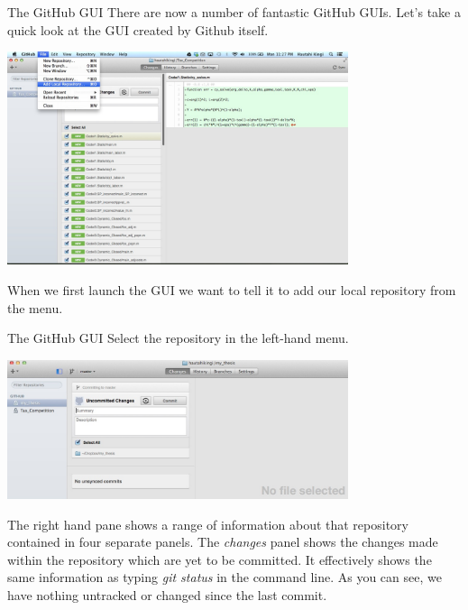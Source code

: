 \documentclass[10pt]{beamer}
\begin{document}
\begin{frame}[fragile]{The GitHub GUI}
There are now a number of fantastic GitHub GUIs. Let's take a quick look at the GUI created by Github itself.


\begin{center}
\includegraphics[width=10cm]{./auxfiles/GUI_add.jpg}
\end{center}

When we first launch the GUI we want to tell it to add our local repository from the menu.


\end{frame}
\begin{frame}[fragile]{The GitHub GUI}
Select the repository in the left-hand menu. 
\begin{center}
\includegraphics[width=10cm]{./auxfiles/GUI_changes.jpg}
\end{center}
The right hand pane shows a range of information about that repository contained in four separate panels. The \emph{changes} panel shows the changes made within the repository which are yet to be committed. It effectively shows the same information as typing \emph{git status} in the command line. As you can see, we have nothing untracked or changed since the last commit.

\end{frame}
\end{document}
